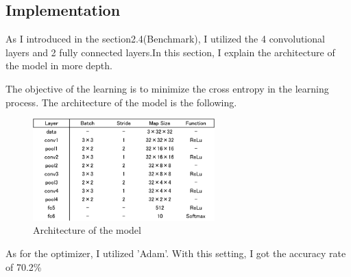 \subsection{Implementation}


As I introduced in the section2.4(Benchmark), I utilized the 4 convolutional layers and 2 fully connected layers.In this section, I explain the architecture of the model in more depth.

The objective of the learning is to minimize the cross entropy in the learning process.
The architecture of the model is the following.

 \begin{figure}[H]

	\begin{center}
	\includegraphics[width=7cm]{picture/layer_architecture.png}
	\caption{Architecture of the model}
	\end{center}
	\label{fig:9}

\end{figure}


As for the optimizer, I utilized 'Adam'.
With this setting, I got the accuracy rate of 70.2\%